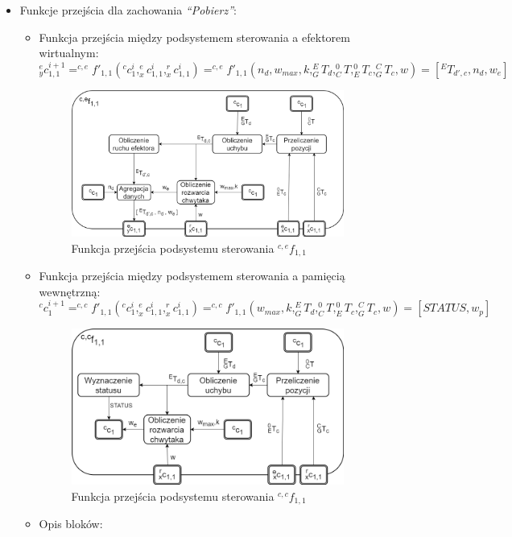 \documentclass{article}
\begin{document}
\begin{itemize}
\item Funkcje przej\'scia dla zachowania \textit{``Pobierz''}:
\begin{itemize}
\item Funkcja przej\'scia między podsystemem sterowania a efektorem wirtualnym:
\[ ^e_yc_{1,1}^{i+1}= ^{c,e}f'_{1,1}(^cc_1^i,^e_xc_{1,1}^i,^r_xc_{1,1}^i)= ^{c,e}f'_{1,1}(n_d,w_{max},k,^E_GT_d,^0_CT,^0_ET_c,^C_GT_c,w)=[ ^ET_{d',c},n_d,w_e ]\]
\begin{figure}[H]
	\centering
	\includegraphics[width=0.9\textwidth]{PS_funkcje1v1.png}
	\caption{Funkcja przej\'scia podsystemu sterowania $^{c,e}f_{1,1}$}
	\label{fig::PS_funkcje1v1}
\end{figure}
\item Funkcja przej\'scia między podsystemem sterowania a pamięcią wewnętrzną:
\[ ^cc_{1}^{i+1}= ^{c,c}f'_{1,1}(^cc_1^i,^e_xc_{1,1}^i,^r_xc_{1,1}^i) = ^{c,c}f'_{1,1}(w_{max},k,^E_GT_d,^0_CT,^0_ET_c,^C_GT_c,w) = [STATUS,w_p]\]
\begin{figure}[H]
	\centering
	\includegraphics[width=0.9\textwidth]{PS_funkcje2v1.png}
	\caption{Funkcja przej\'scia podsystemu sterowania $^{c,c}f_{1,1}$}
	\label{fig::PS_funkcje2v1}
\end{figure}
\item Opis bloków:

\end{itemize}
\end{itemize}
\end{document}

